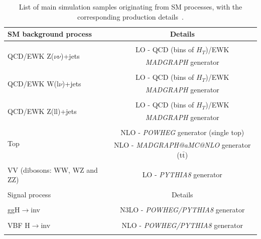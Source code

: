 \begin{table}[ht!]
    \centering
    \small
    \begin{tabular}{l  c }
        SM background process                                                  & Details    \\\hline
        & \\
        \multirow{2}{*}{QCD/EWK Z($\nu\nu$)+jets}                                                 &  LO - QCD (bins of $H_T$)/EWK    \\
                                                                                                 & \emph{MADGRAPH} generator\\
        & \\
        \multirow{2}{*}{QCD/EWK W(l$\nu$)+jets}                                                 &  LO - QCD (bins of $H_T$)/EWK\\
                                                                                                 & \emph{MADGRAPH} generator\\
        & \\
        \multirow{2}{*}{QCD/EWK Z(ll)+jets}                                                 &  LO - QCD (bins of $H_T$)/EWK\\
                                                                                                 & \emph{MADGRAPH} generator\\
        & \\
        \multirow{2}{*}{Top}                                                 &  NLO - \emph{POWHEG} generator (single top) \\
                                                                                                 &NLO - \emph{MADGRAPH@aMC@NLO} generator (t$\bar{\text{t}}$)\\
        & \\
            \multirow{1}{*}{VV (dibosons: WW, WZ and ZZ)}                                                 &  LO - \emph{PYTHIA8} generator\\
                    & \\\hline
                                                                       Signal process                                                  & Details    \\\hline        & \\
            \multirow{1}{*}{ggH$\rightarrow$inv}                                                 &  N3LO - \emph{POWHEG/PYTHIA8} generator \\      
        & \\
            \multirow{1}{*}{VBF H$\rightarrow$inv}                                                 &  NLO - \emph{POWHEG/PYTHIA8} generator \\      
        & \\
        \hline 
    \end{tabular}
    \caption{List of main simulation samples originating from SM processes, with the corresponding production details~\cite{note:AN_19_257}.}
    \label{tab:samples}
\end{table}

